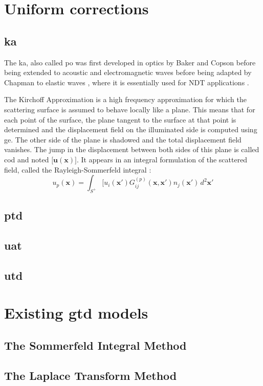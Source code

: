\section{Uniform corrections}

\subsection{\acrfull{ka}}
The \acrfull{ka}, also called \acrfull{po} was first developed in optics by Baker and Copson \cite{POoptics} before being extended to acoustic and electromagnetic waves \cite{POtechreport, POLewis} before being adapted by Chapman to elastic waves \cite{POChapman}, where it is essentially used for NDT applications \cite{Schmerr,Dorval}.

The Kirchoff Approximation is a high frequency approximation for which the scattering surface is assumed to behave locally like a plane. This means that for each point of the surface, the plane tangent to the surface at that point is determined and the displacement field on the illuminated side is computed using \acrshort{ge}. The other side of the plane is shadowed and the total displacement field vanishes. The jump in the displacement between both sides of this plane is called \acrfull{cod} and noted $\lbrack \mathbf{u}(\mathbf{x}) \rbrack$. It appears in an integral formulation of the scattered field, called the Rayleigh-Sommerfeld integral :
\begin{equation}
u_p(\mathbf{x})=\int_{S^+}\lbrack u_i(\mathbf{x'})G_{ij}^{(p)}(\mathbf{x},\mathbf{x'})n_j(\mathbf{x'})\,d^2\mathbf{x'}
\end{equation}

\subsection{\acrfull{ptd}}
\subsection{\acrfull{uat}}
\subsection{\acrfull{utd}}

\section{Existing \acrshort{gtd} models}
\subsection{The Sommerfeld Integral Method}
\subsection{The Laplace Transform Method}
